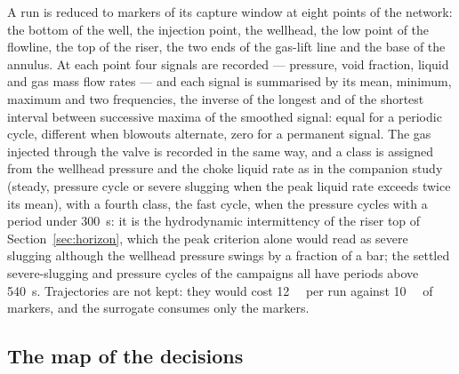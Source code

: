 \documentclass[a4paper,fleqn]{cas-sc}
\begin{document}
A run is reduced to markers of its capture window at eight points of the network: the bottom of the well, the injection point, the wellhead, the low point of the flowline, the top of the riser, the two ends of the gas-lift line and the base of the annulus. At each point four signals are recorded --- pressure, void fraction, liquid and gas mass flow rates --- and each signal is summarised by its mean, minimum, maximum and two frequencies, the inverse of the longest and of the shortest interval between successive maxima of the smoothed signal: equal for a periodic cycle, different when blowouts alternate, zero for a permanent signal. The gas injected through the valve is recorded in the same way, and a class is assigned from the wellhead pressure and the choke liquid rate as in the companion study (steady, pressure cycle or severe slugging when the peak liquid rate exceeds twice its mean), with a fourth class, the fast cycle, when the pressure cycles with a period under \SI{300}{\second}: it is the hydrodynamic intermittency of the riser top of Section~\ref{sec:horizon}, which the peak criterion alone would read as severe slugging although the wellhead pressure swings by a fraction of a bar; the settled severe-slugging and pressure cycles of the campaigns all have periods above \SI{540}{\second}. Trajectories are not kept: they would cost \SI{12}{\mega\byte} per run against \SI{10}{\kilo\byte} of markers, and the surrogate consumes only the markers.

\subsection{The map of the decisions}\label{sec:map}
\end{document}

